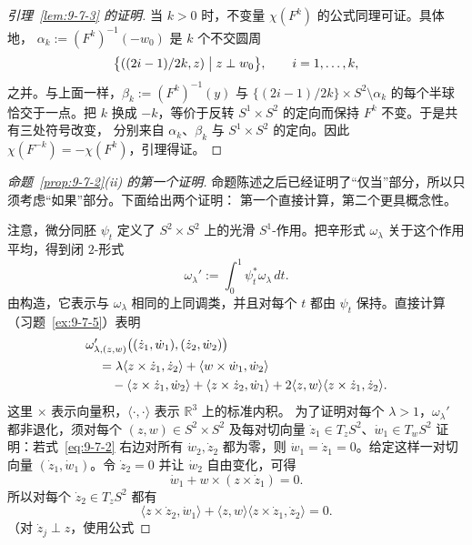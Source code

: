 \begin{proof}[引理~\ref{lem:9-7-3} 的证明]
当 $k>0$ 时，不变量 $\chi(F^k)$ 的公式同理可证。具体地，
$\alpha_k:=(F^k)^{-1}(-w_0)$ 是 $k$ 个不交圆周
\[
  \bigl\{((2i-1)/2k,z)\bigm|z\perp w_0\bigr\},
  \qquad i=1,\ldots,k,
\]
之并。与上面一样，$\beta_k:=(F^k)^{-1}(y)$ 与
$\{(2i-1)/2k\}\times S^2\setminus\alpha_k$ 的每个半球恰交于一点。把 $k$ 换成
$-k$，等价于反转 $S^1\times S^2$ 的定向而保持 $F^k$ 不变。于是共有三处符号改变，
分别来自 $\alpha_k$、$\beta_k$ 与 $S^1\times S^2$ 的定向。因此
$\chi(F^{-k})=-\chi(F^k)$，引理得证。
\end{proof}

\begin{proof}[命题~\ref{prop:9-7-2}(ii) 的第一个证明]
命题陈述之后已经证明了“仅当”部分，所以只须考虑“如果”部分。下面给出两个证明：
第一个直接计算，第二个更具概念性。

注意，微分同胚 $\psi_t$ 定义了 $S^2\times S^2$ 上的光滑 $S^1$-作用。把辛形式
$\omega_\lambda$ 关于这个作用平均，得到闭 $2$-形式
\[
  \omega_\lambda':=\int_0^1\psi_t^*\omega_\lambda\,dt.
\]
由构造，它表示与 $\omega_\lambda$ 相同的上同调类，并且对每个 $t$ 都由 $\psi_t$
保持。直接计算（习题~\ref{ex:9-7-5}）表明
\begin{align}
&\omega'_{\lambda,(z,w)}
  \bigl((\dot z_1,\dot w_1),(\dot z_2,\dot w_2)\bigr)\notag\\
&\quad=\lambda\langle z\times\dot z_1,\dot z_2\rangle
  +\langle w\times\dot w_1,\dot w_2\rangle\notag\\
&\qquad-\langle z\times\dot z_1,\dot w_2\rangle
  +\langle z\times\dot z_2,\dot w_1\rangle
  +2\langle z,w\rangle\langle z\times\dot z_1,\dot z_2\rangle.
  \label{eq:9-7-2}
\end{align}
这里 $\times$ 表示向量积，$\langle\cdot,\cdot\rangle$ 表示 $\mathbb R^3$ 上的标准内积。
为了证明对每个 $\lambda>1$，$\omega_\lambda'$ 都非退化，须对每个
$(z,w)\in S^2\times S^2$ 及每对切向量
$\dot z_1\in T_zS^2$、$\dot w_1\in T_wS^2$ 证明：若式~\eqref{eq:9-7-2}
右边对所有 $\dot w_2,\dot z_2$ 都为零，则 $\dot w_1=\dot z_1=0$。给定这样一对切向量
$(\dot z_1,\dot w_1)$。令 $\dot z_2=0$ 并让 $\dot w_2$ 自由变化，可得
\begin{equation}\label{eq:9-7-3}
  \dot w_1+w\times(z\times\dot z_1)=0.
\end{equation}
所以对每个 $\dot z_2\in T_zS^2$ 都有
\begin{equation}\label{eq:9-7-4}
  \langle z\times\dot z_2,\dot w_1\rangle
  +\langle z,w\rangle
   \langle z\times\dot z_1,\dot z_2\rangle=0.
\end{equation}
（对 $\dot z_j\perp z$，使用公式

\end{proof}
